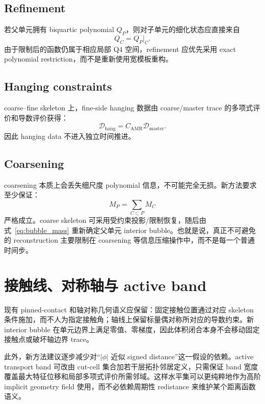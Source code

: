\documentclass[11pt,a4paper]{ctexart}
\begin{document}
\subsection{Refinement}

若父单元拥有 biquartic polynomial $Q_P$，则对子单元的细化状态应直接来自
\begin{equation}
    Q_C=Q_P|_C.
\end{equation}
由于限制后的函数仍属于相应局部 Q4 空间，refinement 应优先采用 exact polynomial restriction，而不是重新使用宽模板重构。

\subsection{Hanging constraints}

coarse--fine skeleton 上，fine-side hanging 数据由 coarse/master trace 的多项式评价和导数评价获得：
\begin{equation}
    \boxed{
    \mathcal D_{\mathrm{hang}}
    =C_{\mathrm{AMR}}\mathcal D_{\mathrm{master}}.
    }
\end{equation}
因此 hanging data 不进入独立时间推进。

\subsection{Coarsening}

coarsening 本质上会丢失细尺度 polynomial 信息，不可能完全无损。新方法要求至少保证：
\begin{equation}
    M_P=\sum_{C\subset P}M_C
    \label{eq:coarsenmass}
\end{equation}
严格成立。coarse skeleton 可采用受约束投影/限制恢复，随后由式~\eqref{eq:bubble_mass} 重新确定父单元 interior bubble。也就是说，真正不可避免的 reconstruction 主要限制在 coarsening 等信息压缩操作中，而不是每一个普通时间步。

\section{接触线、对称轴与 active band}

现有 pinned-contact 和轴对称几何语义应保留：固定接触位置通过对应 skeleton 条件施加，而不人为指定接触角；轴线上保留标量偶对称所对应的导数约束。新 interior bubble 在单元边界上满足零值、零梯度，因此体积闭合本身不会移动固定接触点或破坏轴边界 trace。

此外，新方法建议逐步减少对“$|\phi|$ 近似 signed distance”这一假设的依赖。active transport band 可改由 cut-cell 集合加若干层拓扑邻居定义，只需保证 band 宽度覆盖最大特征位移和局部多项式评价所需邻域。这样水平集可以更纯粹地作为高阶 implicit geometry field 使用，而不必依赖周期性 redistance 来维护某个距离函数语义。
\end{document}
